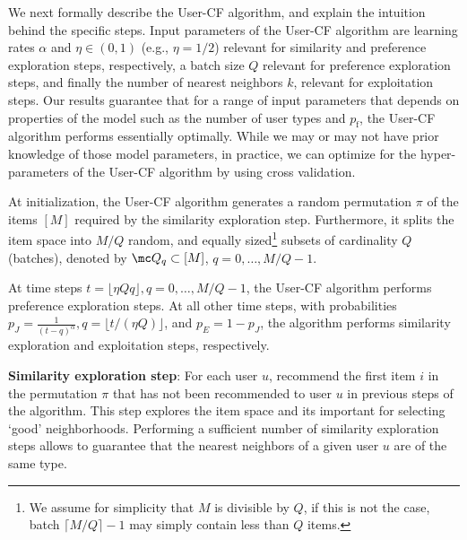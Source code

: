 \documentclass{article}
\newcommand\pf{p_{\mathrm{f}}}
\newcommand\nitem{M}
\newcommand{\setQ}{\mc Q}
\begin{document}
We next formally describe the User-CF algorithm, and explain the intuition behind the specific steps. 
Input parameters of the User-CF algorithm are learning rates $\alpha$ and $\eta \in (0,1)$ (e.g., $\eta=1/2$)  relevant for similarity and preference exploration steps, respectively, a batch size $Q$ relevant for preference exploration steps, and finally the number of nearest neighbors $k$, relevant for exploitation steps. 
Our results guarantee that for a range of input parameters that depends on properties of the model such as the number of user types and $\pf$, the User-CF algorithm performs essentially optimally. 
While we may or may not have prior knowledge of those model parameters, in practice, we can optimize for the hyper-parameters of the User-CF algorithm by using cross validation. 

At initialization, the User-CF algorithm generates a random permutation $\pi$ of the items $[M]$ required by the similarity exploration step. 
Furthermore, it splits the item space into $M/Q$ random, and equally sized\footnote{We assume for simplicity that $\nitem$ is divisible by $Q$, if this is not the case, batch $\lceil M/Q \rceil-1$ may simply contain less than $Q$ items.}
subsets of cardinality $Q$ (batches), denoted by $\setQ_q \subset [M]$, $q=0,\ldots,M/Q-1$. 

At time steps $t = \lfloor \eta Q q \rfloor, q = 0,\ldots,M/Q-1$, the User-CF algorithm performs preference exploration steps. 
At all other time steps, with probabilities 
$
p_J = \frac{1}{(t-q)^\alpha}, q = \lfloor t / (\eta Q)\rfloor$, and $p_E = 1- p_J
$, the algorithm performs similarity exploration and exploitation steps, respectively. 

{\bf Similarity exploration step}: For each user $u$, recommend the first item $i$ in the permutation $\pi$ that has not been recommended to user $u$ in previous steps of the algorithm. 
This step explores the item space and its important for selecting `good' neighborhoods. Performing a sufficient number of similarity exploration steps allows to guarantee that the nearest neighbors of a given user $u$ are of the same type. %
%
\end{document}
